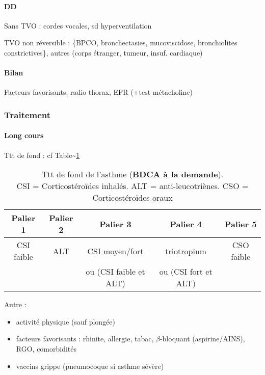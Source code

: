\documentclass[11pt]{article}
\begin{document}
\paragraph{DD}
\label{sec:orgb735564}
Sans TVO : cordes vocales, sd hyperventilation

TVO non réversible : \{BPCO, bronchectasies, mucoviscidose, bronchiolites
constrictives\}, autres (corps étranger, tumeur, insuf. cardiaque)
\paragraph{Bilan}
\label{sec:org7066002}
Facteurs favorisants, radio thorax, EFR (+test métacholine)

\subsubsection{Traitement}
\label{sec:orgcdc18b6}

\paragraph{Long cours}
\label{sec:org2841791}
Ttt de fond : cf Table\textasciitilde{}\ref{tab:ttt_asthme}

\begin{table}
  \centering
  \begin{tabular}{ccccc}
    \toprule
    Palier 1 & Palier 2 & Palier 3 & Palier 4 & Palier 5 \\
    \midrule
    CSI faible & ALT & CSI moyen/fort & triotropium & CSO faible\\
             & & ou (CSI faible et ALT) & ou (CSI fort et ALT) &\\
  \bottomrule                                                              
  \end{tabular}
  \caption{Ttt de fond de l'asthme (\textbf{BDCA à la demande}).\\
    CSI = Corticostéroïdes inhalés. ALT =
    anti-leucotriènes. CSO = Corticostéroïdes oraux}
  \label{tab:ttt_asthme}
\end{table}

Autre : 

\begin{itemize}
\item activité physique (sauf plongée)
\item facteurs favorisants : rhinite, allergie, tabac, \(\beta\)-bloquant
(aspirine/AINS), RGO, comorbidités
\item vaccins grippe (pneumocoque si asthme sévère)
\end{itemize}
\end{document}
